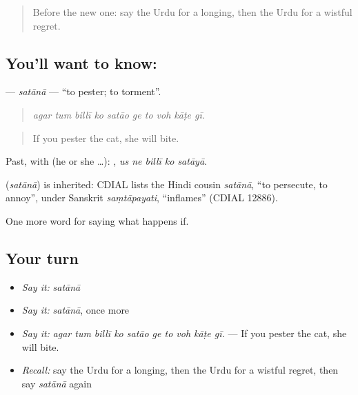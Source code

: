 \label{lesson:UR-C369-satana}



\begin{quote}
Before the new one: say the Urdu for a longing, then the Urdu for a wistful regret.
\end{quote}

\subsection*{You'll want to know: }
\textbf{} — \emph{satānā} — \textquotedblleft{}to pester; to torment\textquotedblright{}.

\begin{quote}
         
\end{quote}

\begin{quote}
\emph{agar tum billī ko satāo ge to voh kāṭe gī.}
\end{quote}

\begin{quote}
If you pester the cat, she will bite.
\end{quote}

Past, with  (he or she …):     , \emph{us ne billī ko satāyā}.

\begin{cousinweb}
\textbf{} (\emph{satānā}) is inherited: CDIAL lists the Hindi cousin \emph{satānā}, \textquotedblleft{}to persecute, to annoy\textquotedblright{}, under Sanskrit \emph{saṃtāpayati}, \textquotedblleft{}inflames\textquotedblright{} (CDIAL 12886).
\end{cousinweb}

\begin{grammarlens}[title={What you've built}]
One more word for saying what happens if.
\end{grammarlens}

\subsection*{Your turn}
\begin{itemize}
\raggedright
  \item \emph{Say it:} \emph{satānā}
  \item \emph{Say it:} \emph{satānā}, once more
  \item \emph{Say it:} \emph{agar tum billī ko satāo ge to voh kāṭe gī.} — If you pester the cat, she will bite.
  \item \emph{Recall:} say the Urdu for a longing, then the Urdu for a wistful regret, then say \emph{satānā} again
\end{itemize}


